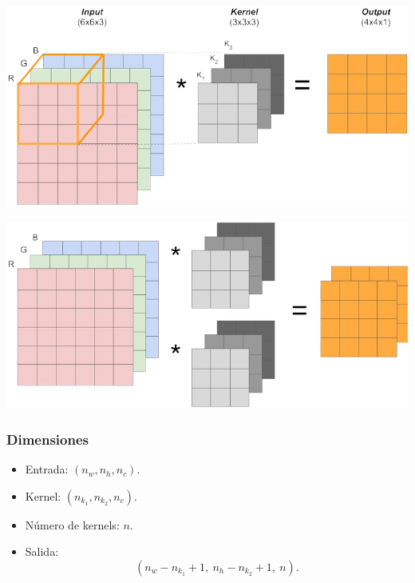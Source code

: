 \begin{frame}
\centering
    \includegraphics[width=0.9\linewidth]{Figuras/Img06.png}
\end{frame}

\begin{frame}
\centering
    \includegraphics[width=0.9\linewidth]{Figuras/Img07.png}
\end{frame}

\begin{frame}
    \frametitle{Dimensiones}

    \begin{itemize}
        \item Entrada: $(n_w,n_h,n_c)$.
        \item Kernel: $(n_{k_1},n_{k_2},n_c)$.
        \item Número de kernels: $n$.
        \item Salida: 
        \[
            (n_w - n_{k_1} + 1,\ n_h - n_{k_2} + 1,\ n).
        \]
    \end{itemize}
    
\end{frame}


